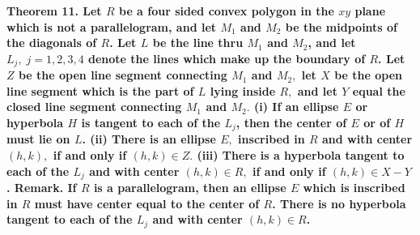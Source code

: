 \bf Theorem 11. \rm  
Let $R$ be a four sided \bf convex \rm polygon in the $xy$ plane which is not a parallelogram, and let $M_{1}$ and $M_{2}$ be the midpoints of the diagonals of $R$. Let $L$ be the line thru $M_{1}$ and $M_{2}$, and let $L_{j},\;j=1,2,3,4$ denote the lines which make up the boundary of $R$. Let $Z$ be the open line segment connecting $M_{1}$ and $M_{2},$ let $X$ be the open line segment which is the part of $L$ lying inside $R,$ and let $Y$ equal the \bf closed \rm line segment connecting $M_{1}$ and $M_{2}.$ \newline
(i) If an ellipse $E$ or hyperbola $H$ is tangent to each of the $L_{j}$, then the center of $E$ or of $H$ must lie on $L$. \newline
(ii) There is an ellipse $E,$ \bf inscribed \rm in $R$ and with center $(h,k),$ if and only if $(h,k)\in Z.$ \newline
(iii) There is a hyperbola tangent to each of the $L_{j}$ and with center $(h,k)\in R,$ if and only if $(h,k)\in X-Y$.
\nl \bf Remark. \rm If $R$ is a parallelogram, then an ellipse $E$ which is inscribed in $R$ must have center equal to the center of $R$. There is no hyperbola tangent to each of the $L_{j}$ and with center $(h,k)\in R$. 
